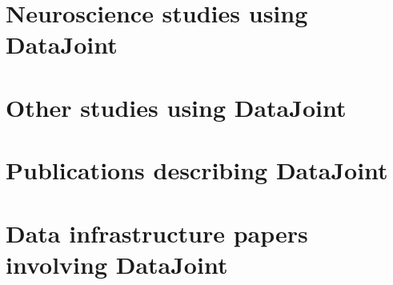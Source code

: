 \documentclass[letter,10pt]{article}
\begin{document}
\section*{Neuroscience studies using DataJoint}

\cite{vai-2013, cotton-2013, ecker-2014, reimer2014pupil, erisken-2014, 
froudarakis_population_2014, yatsenko2015a, jiang_principles_2015,
shan2016spatial, cadwell2016, baden2016functional,
reimer-2016, franke-2017, denfield2018attentional, 
sinz2018stimulus, roson2019mouse, walker2019inception, fahey2019global, cadena2019deep, heath2020circuit,
aguillon2020standardized}

\section*{Other studies using DataJoint}
\cite{hartmann2016alternative}

\section*{Publications describing DataJoint}
\cite{yatsenko-datajoint-2015, yatsenko-2018-datajoint, singer2019}

\section*{Data infrastructure papers involving DataJoint}
\cite{bonacchi2019data}



\end{document}
